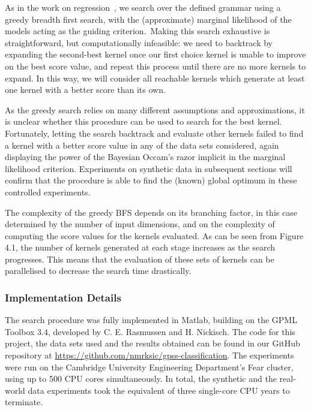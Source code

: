 \documentclass[a4paper,12pt ]{report}
\begin{document}
As in the work on regression~\cite{duvenaud13}, we search over the defined grammar using a greedy breadth first search, with the (approximate) marginal likelihood of the models acting as the guiding criterion.~Making this search exhaustive is straightforward, but computationally infeasible: we need to backtrack by expanding the second-best kernel once our first choice kernel is unable to improve on the best score value, and repeat this process until there are no more kernels to expand. In this way, we will consider all reachable kernels which generate at least one kernel with a better score than its own.



As the greedy search relies on many different assumptions and approximations, it is unclear whether this procedure can be used to search for the best kernel. Fortunately, letting the search backtrack and evaluate other kernels failed to find a kernel with a better score value in any of the data sets considered, again displaying the power of the Bayesian Occam's razor implicit in the marginal likelihood criterion. Experiments on synthetic data in subsequent sections will confirm that the procedure is able to find the (known) global optimum in these controlled experiments.

The complexity of the greedy BFS depends on its branching factor, in this case determined by the number of input dimensions, and on the complexity of computing the score values for the kernels evaluated. As can be seen from Figure 4.1, the number of kernels generated at each stage increases as the search progresses. This means that the evaluation of these sets of kernels can be parallelised to decrease the search time drastically.


\subsubsection*{Implementation Details}

The search procedure was fully implemented in Matlab, building on the GPML Toolbox 3.4, developed by C. E. Rasmussen and H. Nickisch. The code for this project, the data sets used and the results obtained can be found in our GitHub repository at \url{https://github.com/nmrksic/gpss-classification}. The experiments were run on the Cambridge University Engineering Department's Fear cluster, using up to 500 CPU cores simultaneously. In total, the synthetic and the real-world data experiments took the equivalent of three single-core CPU years to terminate.
\end{document}
